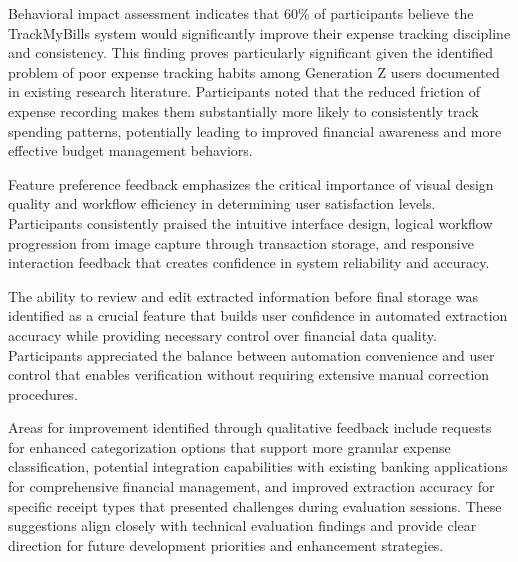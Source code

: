 Behavioral impact assessment indicates that 60\% of participants believe the TrackMyBills system would significantly improve their expense tracking discipline and consistency. This finding proves particularly significant given the identified problem of poor expense tracking habits among Generation Z users documented in existing research literature. Participants noted that the reduced friction of expense recording makes them substantially more likely to consistently track spending patterns, potentially leading to improved financial awareness and more effective budget management behaviors.

Feature preference feedback emphasizes the critical importance of visual design quality and workflow efficiency in determining user satisfaction levels. Participants consistently praised the intuitive interface design, logical workflow progression from image capture through transaction storage, and responsive interaction feedback that creates confidence in system reliability and accuracy.

The ability to review and edit extracted information before final storage was identified as a crucial feature that builds user confidence in automated extraction accuracy while providing necessary control over financial data quality. Participants appreciated the balance between automation convenience and user control that enables verification without requiring extensive manual correction procedures.

Areas for improvement identified through qualitative feedback include requests for enhanced categorization options that support more granular expense classification, potential integration capabilities with existing banking applications for comprehensive financial management, and improved extraction accuracy for specific receipt types that presented challenges during evaluation sessions. These suggestions align closely with technical evaluation findings and provide clear direction for future development priorities and enhancement strategies.